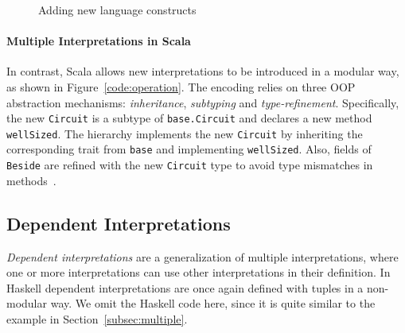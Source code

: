 \begin{figure}
\caption{Adding new language constructs}
\label{code:variant}
\end{figure}

\paragraph{Multiple Interpretations in Scala}
In contrast, Scala allows new interpretations to be introduced in a 
modular way, as shown in Figure~\ref{code:operation}.
The encoding relies on three OOP abstraction mechanisms:
\emph{inheritance}, \emph{subtyping} and \emph{type-refinement}.
Specifically, the new \lstinline{Circuit} is a subtype of
\lstinline{base.Circuit} and declares a new method \lstinline{wellSized}.
The hierarchy implements the new \lstinline{Circuit} by inheriting the corresponding trait from \lstinline{base} and
implementing \lstinline{wellSized}.
Also, fields of \lstinline{Beside} are refined with the new \lstinline{Circuit} type
to avoid type mismatches in methods~\cite{eptrivially16}.


\begin{comment}
We can even define \lstinline{wellSized} independently:
\begin{lstlisting}
trait Circuit { def wellSized: Boolean }
trait Id extends Circuit { ... }
...
\end{lstlisting}
And merge the two hierarchies through \emph{multiple inheritance} for providing
multiple interpretations:
\begin{lstlisting}
trait Circuit
    extends width.Circuit with wellSized.Circuit
trait Id extends Circuit
    with width.Id with wellSized.Circuit
...
\end{lstlisting}
\end{comment}

\subsection{Dependent Interpretations}
 \emph{Dependent interpretations} are a generalization of multiple
interpretations, where one or more interpretations can use other
interpretations in their definition. 
In Haskell dependent interpretations are once again defined with
tuples in a non-modular way. We omit the Haskell code here, since 
it is quite similar to the example in Section~\ref{subsec:multiple}.


